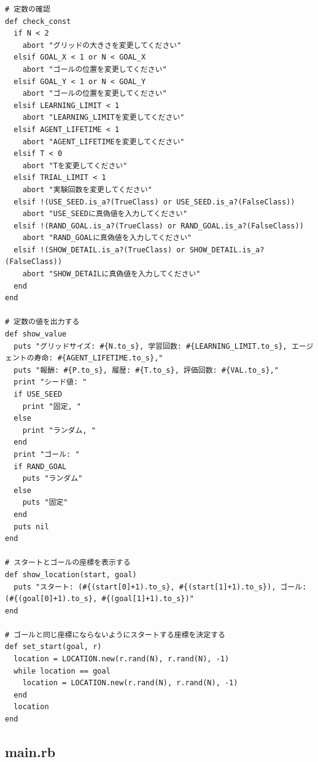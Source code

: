 \documentclass[a4j,11pt]{jarticle}
\begin{document}
\begin{verbatim}
# 定数の確認
def check_const
  if N < 2
    abort "グリッドの大きさを変更してください"
  elsif GOAL_X < 1 or N < GOAL_X
    abort "ゴールの位置を変更してください"
  elsif GOAL_Y < 1 or N < GOAL_Y
    abort "ゴールの位置を変更してください"
  elsif LEARNING_LIMIT < 1
    abort "LEARNING_LIMITを変更してください"
  elsif AGENT_LIFETIME < 1
    abort "AGENT_LIFETIMEを変更してください"
  elsif T < 0
    abort "Tを変更してください"
  elsif TRIAL_LIMIT < 1
    abort "実験回数を変更してください"
  elsif !(USE_SEED.is_a?(TrueClass) or USE_SEED.is_a?(FalseClass))
    abort "USE_SEEDに真偽値を入力してください"
  elsif !(RAND_GOAL.is_a?(TrueClass) or RAND_GOAL.is_a?(FalseClass))
    abort "RAND_GOALに真偽値を入力してください"
  elsif !(SHOW_DETAIL.is_a?(TrueClass) or SHOW_DETAIL.is_a?(FalseClass))
    abort "SHOW_DETAILに真偽値を入力してください"
  end
end

# 定数の値を出力する
def show_value
  puts "グリッドサイズ: #{N.to_s}, 学習回数: #{LEARNING_LIMIT.to_s}, エージェントの寿命: #{AGENT_LIFETIME.to_s},"
  puts "報酬: #{P.to_s}, 履歴: #{T.to_s}, 評価回数: #{VAL.to_s},"
  print "シード値: "
  if USE_SEED
    print "固定, "
  else
    print "ランダム, "
  end
  print "ゴール: "
  if RAND_GOAL
    puts "ランダム"
  else
    puts "固定"
  end
  puts nil
end

# スタートとゴールの座標を表示する
def show_location(start, goal)
  puts "スタート: (#{(start[0]+1).to_s}, #{(start[1]+1).to_s}), ゴール: (#{(goal[0]+1).to_s}, #{(goal[1]+1).to_s})"
end

# ゴールと同じ座標にならないようにスタートする座標を決定する
def set_start(goal, r)
  location = LOCATION.new(r.rand(N), r.rand(N), -1)
  while location == goal
    location = LOCATION.new(r.rand(N), r.rand(N), -1)
  end
  location
end
\end{verbatim}

\newpage

\subsection{main.rb}
\end{document}
